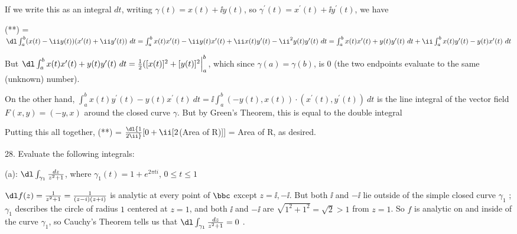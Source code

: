 \msk

\item{} If we write this as an integral $dt$, writing
$\gamma(t)=x(t)+\ii y(t)$, so $\gamma^\prime(t)=x^\prime(t)+\ii y^\prime(t)$, we have 

\ssk

\item{} (**) = $\dl\int_a^b (x(t)-\ii y(t))(x^\prime(t)+\ii y^\prime(t))\ dt
= \int_a^b x(t)x^\prime(t)-\ii y(t)x^\prime(t)+\ii x(t)y^\prime(t)-\ii^2 y(t)y^\prime(t)\ dt
= \int_a^b x(t)x^\prime(t)+y(t)y^\prime(t) \ dt + \ii\int_a^b x(t)y^\prime(t)-y(t)x^\prime(t)\ dt$

\ssk

\item{} But $\dl\int_a^b x(t)x^\prime(t)+y(t)y^\prime(t) \ dt = {{1}\over{2}}([x(t)]^2+[y(t)]^2\Big|_a^b$, which
since $\gamma(a)=\gamma(b)$, is $0$ (the two endpoints evaluate to the same (unknown) number).

\ssk

\item{} On the other hand, $\int_a^b x(t)y^\prime(t)-y(t)x^\prime(t)\ dt = \ii\int_a^b (-y(t),x(t))\cdot(x^\prime(t),y^\prime(t))\ dt$
is the line integral of the vector field $F(x,y)=(-y,x)$ around the closed curve $\gamma$. But by Green's Theorem,
this is equal to the double integral 

\msk


\msk

Putting this all together, (**) = $\dl{{1}\over{2\ii}}[0+\ii[2$(Area of R)]] = Area of R, as desired.


\bsk

\item{28.} Evaluate the following integrals:

\ssk

\item{(a):} $\dl\int_{\gamma_1} {{dz}\over{z^2+1}}$, where $\gamma_1(t)=1+e^{2\pi ti}$, $0\leq t\leq 1$

\msk

\item{} $\dl f(z) = {{1}\over{z^2+1}} = {{1}\over{(z-i)(z+i)}}$ is analytic at every point of 
$\bbc$ except $z=\ii,-\ii$. But both $\ii$ and $-\ii$ lie outside of the
simple closed curve $\gamma_1$ ; $\gamma_1$ describes the circle of radius $1$ centered at $z=1$, and 
both $\ii$ and $-\ii$ are $\sqrt{1^2+1^2}=\sqrt{2} > 1$ from $z=1$. So $f$ is analytic on and inside of
the curve $\gamma_1$, so Cauchy's Theorem tells us that $\dl\int_{\gamma_1} {{dz}\over{z^2+1}}=0$ .

